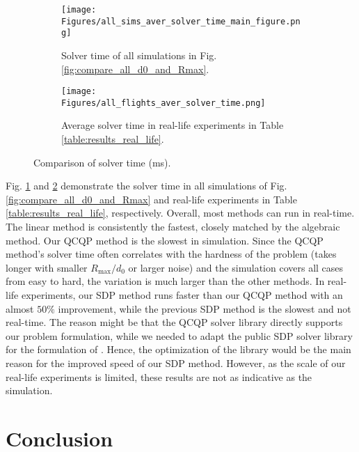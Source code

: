 \documentclass[journal]{IEEEtran}
\begin{document}
\begin{figure}[t]
\centering
    \begin{subfigure}[t]{0.95\linewidth}
    \centering
    \texttt{[image: Figures/all\_sims\_aver\_solver\_time\_main\_figure.png]}
    \caption{Solver time of all simulations in Fig. \ref{fig:compare_all_d0_and_Rmax}.}
    \label{fig:solver_time_sim_only}
    \end{subfigure}
    \hfill
    \begin{subfigure}[t]{\linewidth}
    \centering
	\texttt{[image: Figures/all\_flights\_aver\_solver\_time.png]}
    \caption{Average solver time in real-life experiments in Table \ref{table:results_real_life}.}
    \label{fig:solver_time_real_only}
    \end{subfigure}
    \caption{Comparison of solver time (ms).}
    \label{fig:solver_time_both_sim_real}
\end{figure}


Fig. \ref{fig:solver_time_sim_only} and \ref{fig:solver_time_real_only} demonstrate the solver time in all simulations of Fig. \ref{fig:compare_all_d0_and_Rmax} and real-life experiments in Table \ref{table:results_real_life}, respectively. Overall, most methods can run in real-time. The linear method is consistently the fastest, closely matched by the algebraic method. Our QCQP method is the slowest in simulation. Since the QCQP method's solver time often correlates with the hardness of the problem (takes longer with smaller $R_{\max}/d_0$ or larger noise) and the simulation covers all cases from easy to hard, the variation is much larger than the other methods.
In real-life experiments, our SDP method runs faster than our QCQP method with an almost $50\%$ improvement, while the previous SDP method is the slowest and not real-time. The reason might be that the QCQP solver library directly supports our problem formulation, while we needed to adapt the public SDP solver library for the formulation of \cite{jiang2020rel3D}. Hence, the optimization of the library would be the main reason for the improved speed of our SDP method. However, as the scale of our real-life experiments is limited, these results are not as indicative as the simulation.

\section{Conclusion} \label{sec:conclusion}
\end{document}
